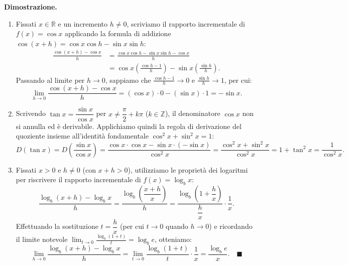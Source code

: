 \noindent\textbf{Dimostrazione.}
\begin{enumerate}
    \item Fissati $x \in \mathbb{R}$ e un incremento $h \neq 0$, scriviamo il rapporto incrementale di $f(x) = \cos x$ applicando la formula di addizione $\cos(x + h) = \cos x \cos h - \sin x \sin h$:
    \begin{align*}
        \frac{\cos(x+h) - \cos x}{h} &= \frac{\cos x \cos h - \sin x \sin h - \cos x}{h} \\
        &= \cos x \left(\frac{\cos h - 1}{h}\right) - \sin x \left(\frac{\sin h}{h}\right).
    \end{align*}
    Passando al limite per $h \to 0$, sappiamo che $\frac{\cos h - 1}{h} \to 0$ e $\frac{\sin h}{h} \to 1$, per cui:
    \[
        \lim_{h \to 0} \frac{\cos(x+h) - \cos x}{h} = (\cos x)\cdot 0 - (\sin x)\cdot 1 = -\sin x.
    \]

    \item Scrivendo $\tan x = \dfrac{\sin x}{\cos x}$ per $x \neq \dfrac{\pi}{2} + k\pi$ ($k \in \mathbb{Z}$), il denominatore $\cos x$ non si annulla ed è derivabile. Applichiamo quindi la regola di derivazione del quoziente insieme all'identità fondamentale $\cos^2 x + \sin^2 x = 1$:
    \[
        D(\tan x) = D\!\left(\frac{\sin x}{\cos x}\right) = \frac{\cos x \cdot \cos x - \sin x \cdot (-\sin x)}{\cos^2 x} = \frac{\cos^2 x + \sin^2 x}{\cos^2 x} = 1 + \tan^2 x = \frac{1}{\cos^2 x}.
    \]

    \item Fissati $x > 0$ e $h \neq 0$ (con $x + h > 0$), utilizziamo le proprietà dei logaritmi per riscrivere il rapporto incrementale di $f(x) = \log_b x$:
    \[
        \frac{\log_b(x+h) - \log_b x}{h} = \frac{\log_b\!\left(\dfrac{x+h}{x}\right)}{h} = \frac{\log_b\!\left(1 + \dfrac{h}{x}\right)}{\dfrac{h}{x}} \cdot \frac{1}{x}.
    \]
    Effettuando la sostituzione $t = \dfrac{h}{x}$ (per cui $t \to 0$ quando $h \to 0$) e ricordando il limite notevole $\lim_{t \to 0} \frac{\log_b(1 + t)}{t} = \log_b e$, otteniamo:
    \[
        \lim_{h \to 0} \frac{\log_b(x+h) - \log_b x}{h} = \lim_{t \to 0} \frac{\log_b(1+t)}{t} \cdot \frac{1}{x} = \frac{\log_b e}{x}. \quad \blacksquare
    \]
\end{enumerate}

